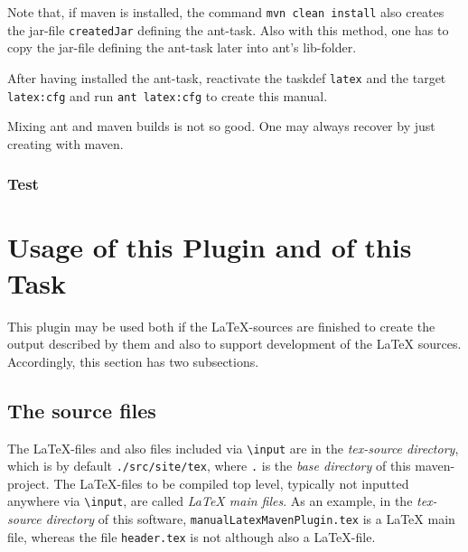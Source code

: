 \documentclass[12pt]{article}
\begin{document}
Note that, if maven is installed, the command {\tt mvn clean install} 
also creates the jar-file {\tt createdJar} defining the ant-task. 
Also with this method, one has to copy the jar-file defining the ant-task 
later into ant's lib-folder. 

After having installed the ant-task, 
reactivate the taskdef {\tt latex} and the target {\tt latex:cfg} 
and run {\tt ant latex:cfg} to create this manual. 

Mixing ant and maven builds is not so good. 
One may always recover by just creating with maven. 

\subsubsection{Test}

\section{Usage of this Plugin and of this Task}\label{sec:usage}

This plugin may be used both if the \LaTeX-sources are finished 
to create the output described by them 
and also to support development of the \LaTeX{} sources. 
Accordingly, this section has two subsections. 

\subsection{The source files}\label{subsec:sources}

The \LaTeX-files and also files included via {\tt\textbackslash input} 
are in the {\em tex-source directory}, 
which is by default {\tt./src/site/tex}, 
where {\tt.} is the {\em base directory\/} of this maven-project. 
The \LaTeX-files to be compiled top level, 
typically not inputted anywhere via {\tt\textbackslash input}, 
are called {\em \LaTeX{} main files}. 
As an example, 
in the {\em tex-source directory\/} of this software, 
{\tt manualLatexMavenPlugin.tex} is a \LaTeX{} main file, 
whereas the file {\tt header.tex} is not although also a \LaTeX-file. 
\end{document}

